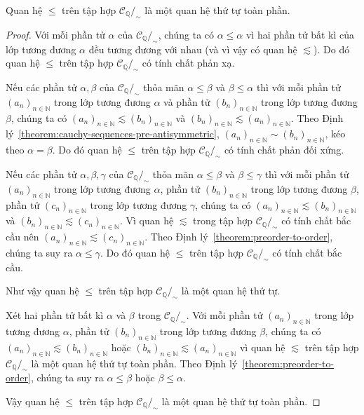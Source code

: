 \begin{theorem}
    Quan hệ $\leq$ trên tập hợp $\mathscr{C}_{\mathbb{Q}}/_{\sim}$ là một quan hệ thứ tự toàn phần.
\end{theorem}

\begin{proof}
    Với mỗi phần tử $\alpha$ của $\mathscr{C}_{\mathbb{Q}}/_{\sim}$, chúng ta có $\alpha\leq\alpha$ vì hai phần tử bất kì của lớp tương đương $\alpha$ đều tương đương với nhau (và vì vậy có quan hệ $\lesssim$). Do đó quan hệ $\leq$ trên tập hợp $\mathscr{C}_{\mathbb{Q}}/_{\sim}$ có tính chất phản xạ.

    Nếu các phần tử $\alpha, \beta$ của $\mathscr{C}_{\mathbb{Q}}/_{\sim}$ thỏa mãn $\alpha\leq \beta$ và $\beta\leq \alpha$ thì với mỗi phần tử ${(a_{n})}_{n\in\mathbb{N}}$ trong lớp tương đương $\alpha$ và phần tử ${(b_{n})}_{n\in\mathbb{N}}$ trong lớp tương đương $\beta$, chúng ta có ${(a_{n})}_{n\in\mathbb{N}}\lesssim {(b_{n})}_{n\in\mathbb{N}}$ và ${(b_{n})}_{n\in\mathbb{N}}\lesssim {(a_{n})}_{n\in\mathbb{N}}$. Theo Định lý~\ref{theorem:cauchy-sequences-pre-antisymmetric}, ${(a_{n})}_{n\in\mathbb{N}}\sim {(b_{n})}_{n\in\mathbb{N}}$, kéo theo $\alpha = \beta$. Do đó quan hệ $\leq$ trên tập hợp $\mathscr{C}_{\mathbb{Q}}/_{\sim}$ có tính chất phản đối xứng.

    Nếu các phần tử $\alpha, \beta, \gamma$ của $\mathscr{C}_{\mathbb{Q}}/_{\sim}$ thỏa mãn $\alpha\leq \beta$ và $\beta\leq \gamma$ thì với mỗi phần tử ${(a_{n})}_{n\in\mathbb{N}}$ trong lớp tương đương $\alpha$, phần tử ${(b_{n})}_{n\in\mathbb{N}}$ trong lớp tương đương $\beta$, phần tử ${(c_{n})}_{n\in\mathbb{N}}$ trong lớp tương đương $\gamma$, chúng ta có ${(a_{n})}_{n\in\mathbb{N}}\lesssim {(b_{n})}_{n\in\mathbb{N}}$ và ${(b_{n})}_{n\in\mathbb{N}}\lesssim {(c_{n})}_{n\in\mathbb{N}}$. Vì quan hệ $\lesssim$ trong tập hợp $\mathscr{C}_{\mathbb{Q}}/_{\sim}$ có tính chất bắc cầu nên ${(a_{n})}_{n\in\mathbb{N}}\lesssim {(c_{n})}_{n\in\mathbb{N}}$. Theo Định lý~\ref{theorem:preorder-to-order}, chúng ta suy ra $\alpha\leq \gamma$. Do đó quan hệ $\leq$ trên tập hợp $\mathscr{C}_{\mathbb{Q}}/_{\sim}$ có tính chất bắc cầu.

    Như vậy quan hệ $\leq$ trên tập hợp $\mathscr{C}_{\mathbb{Q}}/_{\sim}$ là một quan hệ thứ tự.

    Xét hai phần tử bất kì $\alpha$ và $\beta$ trong $\mathscr{C}_{\mathbb{Q}}/_{\sim}$. Với mỗi phần tử ${(a_{n})}_{n\in\mathbb{N}}$ trong lớp tương đương $\alpha$, phần tử ${(b_{n})}_{n\in\mathbb{N}}$ trong lớp tương đương $\beta$, chúng ta có ${(a_{n})}_{n\in\mathbb{N}}\lesssim {(b_{n})}_{n\in\mathbb{N}}$ hoặc ${(b_{n})}_{n\in\mathbb{N}}\lesssim {(a_{n})}_{n\in\mathbb{N}}$ vì quan hệ $\lesssim$ trên tập hợp $\mathscr{C}_{\mathbb{Q}}/_{\sim}$ là một quan hệ thứ tự toàn phần. Theo Định lý~\ref{theorem:preorder-to-order}, chúng ta suy ra $\alpha\leq \beta$ hoặc $\beta\leq \alpha$.

    Vậy quan hệ $\leq$ trên tập hợp $\mathscr{C}_{\mathbb{Q}}/_{\sim}$ là một quan hệ thứ tự toàn phần.
\end{proof}

